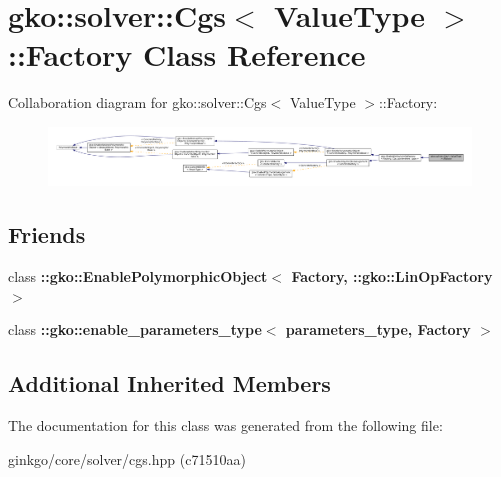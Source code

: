 \hypertarget{classgko_1_1solver_1_1Cgs_1_1Factory}{}\section{gko\+:\+:solver\+:\+:Cgs$<$ Value\+Type $>$\+:\+:Factory Class Reference}
\label{classgko_1_1solver_1_1Cgs_1_1Factory}


Collaboration diagram for gko\+:\+:solver\+:\+:Cgs$<$ Value\+Type $>$\+:\+:Factory\+:
\nopagebreak
\begin{figure}[H]
\begin{center}
\leavevmode
\includegraphics[width=350pt]{classgko_1_1solver_1_1Cgs_1_1Factory__coll__graph}
\end{center}
\end{figure}
\subsection*{Friends}
\begin{DoxyCompactItemize}
\item 
\mbox{\label{classgko_1_1solver_1_1Cgs_1_1Factory_a27e9bbc94a1c1c59f40833153eda8f78}} 
class {\bfseries \+::gko\+::\+Enable\+Polymorphic\+Object$<$ Factory, \+::gko\+::\+Lin\+Op\+Factory $>$}
\item 
\mbox{\label{classgko_1_1solver_1_1Cgs_1_1Factory_a0d176cbd42d6214e11aee8c30ca256fc}} 
class {\bfseries \+::gko\+::enable\+\_\+parameters\+\_\+type$<$ parameters\+\_\+type, Factory $>$}
\end{DoxyCompactItemize}
\subsection*{Additional Inherited Members}


The documentation for this class was generated from the following file\+:\begin{DoxyCompactItemize}
\item 
ginkgo/core/solver/cgs.\+hpp (c71510aa)\end{DoxyCompactItemize}
